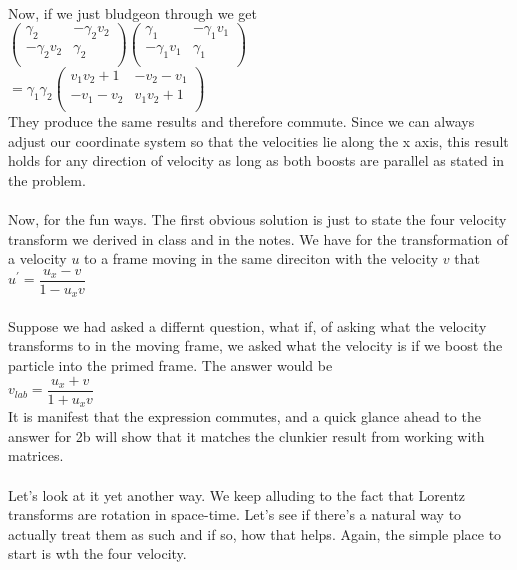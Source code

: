 \documentclass[prb,preprint]
{revtex4-1}
\newcommand{\PRLsep}{\noindent\makebox[\linewidth]{\resizebox{0.8888\linewidth}{2pt}{$\bullet$}}\bigskip}
\begin{document}
\\
Now, if we just bludgeon through we get
\\
$\begin{pmatrix}
\gamma_2 & -\gamma_2 v_2\\
-\gamma_2 v_2 & \gamma_2\\
\end{pmatrix} 
\begin{pmatrix}
\gamma_1 & -\gamma_1 v_1\\
-\gamma_1 v_1 & \gamma_1\\
\end{pmatrix} $
\\
$  = \gamma_1 \gamma_2 
\begin{pmatrix}
v_1 v_2 + 1 & -v_2 - v_1\\
-v_1 - v_2 & v_1 v_2 + 1\\
\end{pmatrix} $
\\
They produce the same results and therefore commute.  Since we can always adjust our coordinate system so that the velocities lie along the x axis, this result holds for any direction of velocity as long as both boosts are parallel as stated in the problem.
\\
\PRLsep
\\
Now, for the fun ways.  The first obvious solution is just to state the four velocity transform we derived in class and in the notes.  We have for the transformation of a velocity $u$ to a frame moving in the same direciton with the velocity $v$ that
\\
$u^\prime = \dfrac{u_x - v}{1-u_x v}$
\\
\\
Suppose we had asked a differnt question, what if, of asking what the velocity transforms to in the moving frame, we asked what the velocity is if we boost the particle into the primed frame.  The answer would be
\\
$v_{lab} = \dfrac{u_x + v}{1+u_x v}$
\\
It is manifest that the expression commutes, and a quick glance ahead to the answer for 2b will show that it matches the clunkier result from working with matrices.
\\
\\
Let's look at it yet another way.  We keep alluding to the fact that Lorentz transforms are rotation in space-time.  Let's see if there's a natural way to actually treat them as such and if so, how that helps.  Again, the  simple place to start is wth the four velocity.
\end{document}
